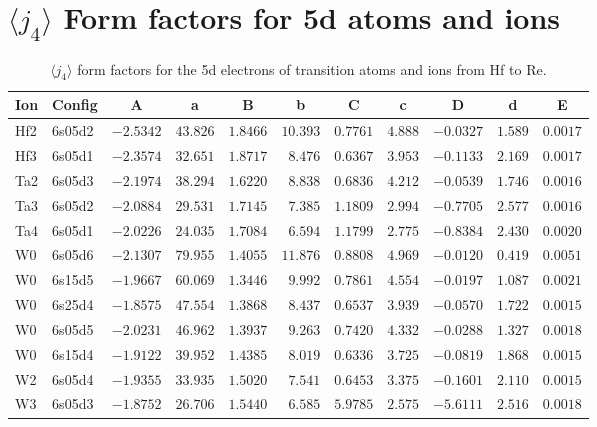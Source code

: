 \section{{\large$\langle j_4\rangle$} Form factors for 5d atoms and ions}
\begin{table}[H]
 \caption{$\langle j_4\rangle$ form factors for the 5d electrons of transition atoms and ions from Hf to Re.\cite{kob:11}}
\label{5dj4}
 \vspace{1ex}
 {\tablesize
\begin{tabular}{llrrrrrrrrr}
\hline
\multicolumn{1}{c}{ Ion}&\multicolumn{1}{c}{ Config}&\multicolumn{1}{c}{ A }&\multicolumn{1}{c}{  a }&\multicolumn{1}{c}{B }&\multicolumn{1}{c}{ b }&\multicolumn{1}{c}{ C }&\multicolumn{1}{c}{ c }&\multicolumn{1}{c}{ D }&\multicolumn{1}{c}{ d }&\multicolumn{1}{c}{E }\\
\hline
Hf2 & 6s05d2 &$-2.5342$ &$43.826$ &$1.8466$ &$10.393$ &$0.7761$ &$4.888$ &$-0.0327$ &$1.589$ &$0.0017$ \\
Hf3 & 6s05d1 &$-2.3574$ &$32.651$ &$1.8717$ &$8.476$ &$0.6367$ &$3.953$ &$-0.1133$ &$2.169$ &$0.0017$ \\
Ta2 & 6s05d3 &$-2.1974$ &$38.294$ &$1.6220$ &$8.838$ &$0.6836$ &$4.212$ &$-0.0539$ &$1.746$ &$0.0016$ \\
Ta3 & 6s05d2 &$-2.0884$ &$29.531$ &$1.7145$ &$7.385$ &$1.1809$ &$2.994$ &$-0.7705$ &$2.577$ &$0.0016$ \\
Ta4 & 6s05d1 &$-2.0226$ &$24.035$ &$1.7084$ &$6.594$ &$1.1799$ &$2.775$ &$-0.8384$ &$2.430$ &$0.0020$ \\
W0 & 6s05d6 &$-2.1307$ &$79.955$ &$1.4055$ &$11.876$ &$0.8808$ &$4.969$ &$-0.0120$ &$0.419$ &$0.0051$ \\
W0 & 6s15d5 &$-1.9667$ &$60.069$ &$1.3446$ &$9.992$ &$0.7861$ &$4.554$ &$-0.0197$ &$1.087$ &$0.0021$ \\
W0 & 6s25d4 &$-1.8575$ &$47.554$ &$1.3868$ &$8.437$ &$0.6537$ &$3.939$ &$-0.0570$ &$1.722$ &$0.0015$ \\
W0 & 6s05d5 &$-2.0231$ &$46.962$ &$1.3937$ &$9.263$ &$0.7420$ &$4.332$ &$-0.0288$ &$1.327$ &$0.0018$ \\
W0 & 6s15d4 &$-1.9122$ &$39.952$ &$1.4385$ &$8.019$ &$0.6336$ &$3.725$ &$-0.0819$ &$1.868$ &$0.0015$ \\
W2 & 6s05d4 &$-1.9355$ &$33.935$ &$1.5020$ &$7.541$ &$0.6453$ &$3.375$ &$-0.1601$ &$2.110$ &$0.0015$ \\
W3 & 6s05d3 &$-1.8752$ &$26.706$ &$1.5440$ &$6.585$ &$5.9785$ &$2.575$ &$-5.6111$ &$2.516$ &$0.0018$ \\

\end{tabular}}
\end{table}
